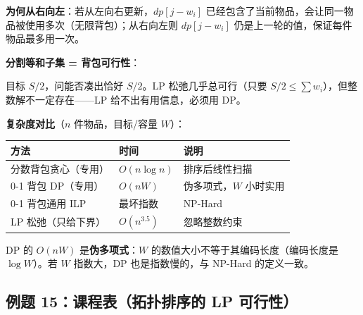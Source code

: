 \documentclass[12pt, a4paper]{ctexart}
\begin{document}
\begin{blackboard}
\textbf{为何从右向左}：若从左向右更新，$dp[j-w_i]$ 已经包含了当前物品，会让同一物品被使用多次（无限背包）；从右向左则 $dp[j-w_i]$ 仍是上一轮的值，保证每件物品最多用一次。

\textbf{分割等和子集 = 背包可行性}：

目标 $S/2$，问能否凑出恰好 $S/2$。LP 松弛几乎总可行（只要 $S/2 \leq \sum w_i$），但整数解不一定存在——LP 给不出有用信息，必须用 DP。

\textbf{复杂度对比}（$n$ 件物品，目标/容量 $W$）：

\begin{center}
\begin{tabular}{lll}
\toprule
方法 & 时间 & 说明 \\
\midrule
分数背包贪心（专用） & $O(n\log n)$ & 排序后线性扫描 \\
0-1 背包 DP（专用） & $O(nW)$ & 伪多项式，$W$ 小时实用 \\
0-1 背包通用 ILP & 最坏指数 & NP-Hard \\
LP 松弛（只给下界） & $O(n^{3.5})$ & 忽略整数约束 \\
\bottomrule
\end{tabular}
\end{center}

DP 的 $O(nW)$ 是\textbf{伪多项式}：$W$ 的数值大小不等于其编码长度（编码长度是 $\log W$）。若 $W$ 指数大，DP 也是指数慢的，与 NP-Hard 的定义一致。

\end{blackboard}

\subsection{例题 15：课程表（拓扑排序的 LP 可行性）}
\end{document}
